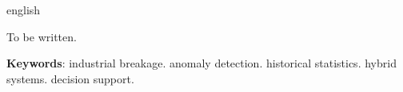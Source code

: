 
\begin{resumo}[Abstract]
 \begin{otherlanguage*}{english}

To be written.

   \textbf{Keywords}: industrial breakage. anomaly detection. historical statistics. hybrid systems. decision support.
 \end{otherlanguage*}
\end{resumo}
